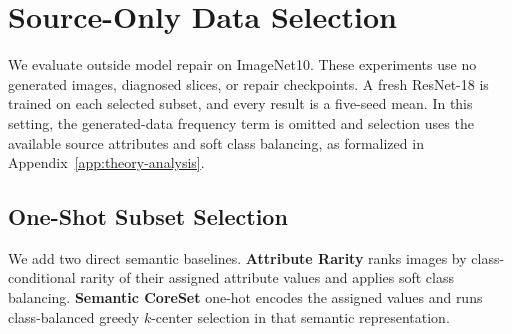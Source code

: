 \section{Source-Only Data Selection}
\label{app:source-only-selection}

We evaluate \model outside model repair on ImageNet10. These experiments use no generated images, diagnosed slices, or repair checkpoints. A fresh ResNet-18 is trained on each selected subset, and every result is a five-seed mean. In this setting, the generated-data frequency term is omitted and selection uses the available source attributes and soft class balancing, as formalized in Appendix~\ref{app:theory-analysis}.

\subsection{One-Shot Subset Selection}

We add two direct semantic baselines. \textbf{Attribute Rarity} ranks images by class-conditional rarity of their assigned attribute values and applies soft class balancing. \textbf{Semantic CoreSet} one-hot encodes the assigned values and runs class-balanced greedy $k$-center selection in that semantic representation.

\begin{table}[h]
\centering
\caption{ImageNet10 source-only one-shot data selection. Metric: five-seed mean test accuracy (\%).}
\label{tab:source-only-one-shot}
\small
\setlength{\tabcolsep}{3pt}
\end{table}

